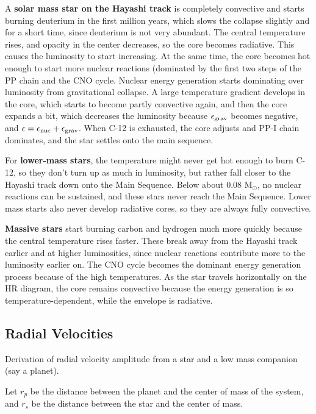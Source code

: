 A \textbf{solar mass star on the Hayashi track} is completely convective and starts burning deuterium in the first million years, which slows the collapse slightly and for a short time, since deuterium is not very abundant. The central temperature rises, and opacity in the center decreases, so the core becomes radiative. This causes the luminosity to start increasing. At the same time, the core becomes hot enough to start more nuclear reactions (dominated by the first two steps of the PP chain and the CNO cycle. Nuclear energy generation starts dominating over luminosity from gravitational collapse. A large temperature gradient develops in the core, which starts to become partly convective again, and then the core expands a bit, which decreases the luminosity because $\epsilon_{\rm grav}$ becomes negative, and $\epsilon = \epsilon_{\rm nuc} + \epsilon_{\rm grav}$. When C-12 is exhausted, the core adjusts and PP-I chain dominates, and the star settles onto the main sequence.

For \textbf{lower-mass stars}, the temperature might never get hot enough to burn C-12, so they don't turn up as much in luminosity, but rather fall closer to the Hayashi track down onto the Main Sequence. Below about 0.08 M$_\odot$, no nuclear reactions can be sustained, and these stars never reach the Main Sequence. Lower mass starts also never develop radiative cores, so they are always fully convective.

\textbf{Massive stars} start burning carbon and hydrogen much more quickly because the central temperature rises faster. These break away from the Hayashi track earlier and at higher luminosities, since nuclear reactions contribute more to the luminosity earlier on. The CNO cycle becomes the dominant energy generation process because of the high temperatures. As the star travels horizontally on the HR diagram, the core remains convective because the energy generation is so temperature-dependent, while the envelope is radiative.


\subsection{Radial Velocities}

Derivation of radial velocity amplitude from a star and a low mass companion (say a planet).

Let $r_p$ be the distance between the planet and the center of mass of the system, and $r_s$ be the distance between the star and the center of mass.

